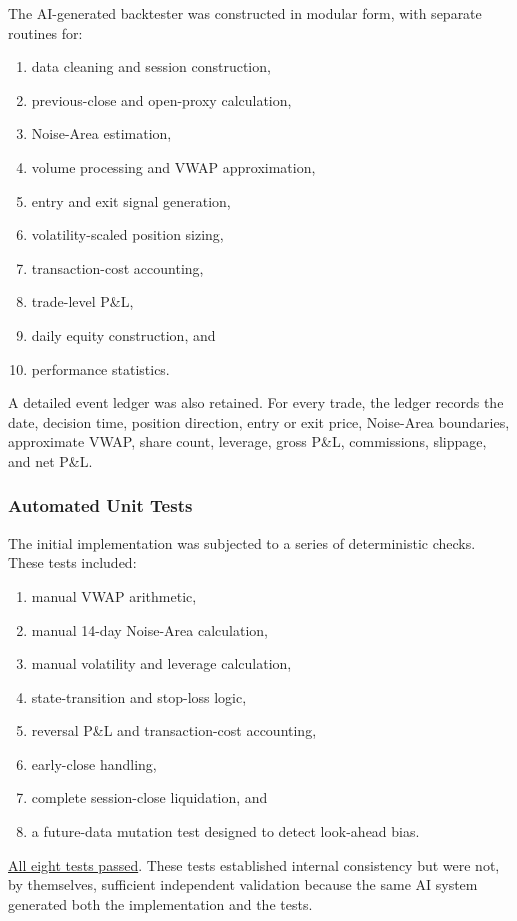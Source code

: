 \documentclass{article}
\begin{document}
The AI-generated backtester was constructed in modular form, with separate routines for:
\begin{enumerate}
    \item data cleaning and session construction,
    \item previous-close and open-proxy calculation,
    \item Noise-Area estimation,
    \item volume processing and VWAP approximation,
    \item entry and exit signal generation,
    \item volatility-scaled position sizing,
    \item transaction-cost accounting,
    \item trade-level P\&L,
    \item daily equity construction, and
    \item performance statistics.
\end{enumerate}

A detailed event ledger was also retained. For every trade, the ledger records the date, decision time, position direction, entry or exit price, Noise-Area boundaries, approximate VWAP, share count, leverage, gross P\&L, commissions, slippage, and net P\&L.

\subsubsection{Automated Unit Tests}

The initial implementation was subjected to a series of deterministic checks. These tests included:
\begin{enumerate}
    \item manual VWAP arithmetic,
    \item manual 14-day Noise-Area calculation,
    \item manual volatility and leverage calculation,
    \item state-transition and stop-loss logic,
    \item reversal P\&L and transaction-cost accounting,
    \item early-close handling,
    \item complete session-close liquidation, and
    \item a future-data mutation test designed to detect look-ahead bias.
\end{enumerate}

\underline{All eight tests passed}. These tests established internal consistency but were not, by themselves, sufficient independent validation because the same AI system generated both the implementation and the tests.
\end{document}
